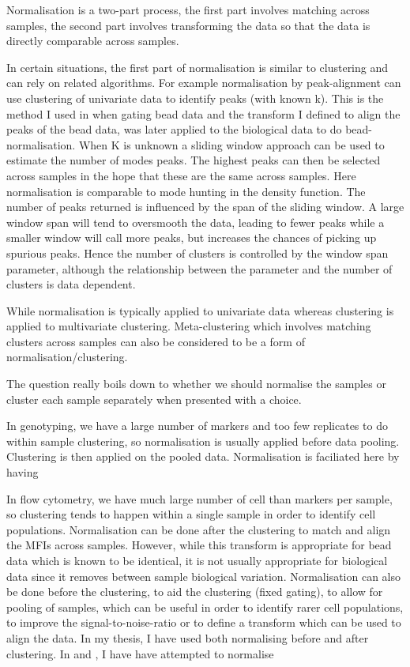 Normalisation is a two-part process, the first part involves matching across samples,
the second part involves transforming the data so that the data is directly comparable across samples.

In certain situations,
the first part of normalisation is similar to clustering and can rely on related algorithms.
For example normalisation by peak-alignment can use clustering of univariate data to identify peaks (with known k).
This is the method I used in  when gating bead data and the transform I defined to align the peaks of the bead data,
was later applied to the biological data to do bead-normalisation.
When K is unknown a sliding window approach can be used to estimate the number of modes peaks.
The highest peaks can then be selected across samples in the hope that these are the same across samples.
Here normalisation is comparable to mode hunting in the density function.
The number of peaks returned is influenced by the span of the sliding window.
A large window span will tend to oversmooth the data, leading to fewer peaks while
a smaller window will call more peaks, but increases the chances of picking up spurious peaks.
Hence the number of clusters is controlled by the window span parameter, although the relationship between the parameter and the number of clusters is data dependent.

While normalisation is typically applied to univariate data whereas clustering is applied to multivariate clustering.
Meta-clustering which involves matching clusters across samples can also be considered to be a form of normalisation/clustering.

The question really boils down to whether we should normalise the samples or cluster each sample separately when presented with a choice.

In genotyping, we have a large number of markers and too few replicates to do within sample clustering, so normalisation is usually applied before data pooling.
Clustering is then applied on the pooled data.
Normalisation is faciliated here by having 

In flow cytometry, we have much large number of cell than markers per sample,
so clustering tends to happen within a single sample in order to identify cell populations.
Normalisation can be done after the clustering to match and align the MFIs across samples.
However, while this transform is appropriate for bead data which is known to be identical,
it is not usually appropriate for biological data since it removes between sample biological variation.
Normalisation can also be done before the clustering, to aid the clustering (fixed gating),
to allow for pooling of samples, which can be useful in order to identify rarer cell populations,
to improve the signal-to-noise-ratio or to define a transform which can be used to align the data.
In my thesis, I have used both normalising before and after clustering.
In  and , I have have attempted to normalise

